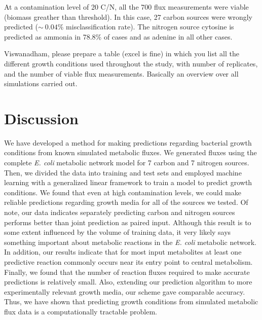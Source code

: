 \documentclass[12pt]{article}
\begin{document}
At a contamination level of 20 C/N, all the 700 flux measurements were viable (biomass greather than threshold). In this case, 27 carbon sources were wrongly predicted ($\sim~0.04\%$ misclassification rate). The nitrogen source cytosine is predicted as ammonia in 78.8\% of cases and as adenine in all other cases.

{\color{red}Viswanadham, please prepare a table (excel is fine) in which you list all the different growth conditions used throughout the study, with number of replicates, and the number of viable flux measurements. Basically an overview over all simulations carried out.}

\section*{Discussion}

We have developed a method for making predictions regarding bacterial growth conditions from known simulated metabolic fluxes. We generated fluxes using the complete \emph{E. coli} metabolic network model for 7 carbon and 7 nitrogen sources. Then, we divided the data into training and test sets and employed machine learning with a generalized linear framework to train a model to predict growth conditions. We found that even at high contamination levels, we could make reliable predictions regarding growth media for all of the sources we tested. Of note, our data indicates separately predicting carbon and nitrogen sources performs better than joint prediction as paired input. Although this result is to some extent influenced by the volume of training data, it very likely says something important about metabolic reactions in the \emph{E. coli} metabolic network. In addition, our results indicate that for most input metabolites at least one predictive reaction commonly occurs near its entry point to central metabolism. Finally, we found that the number of reaction fluxes required to make accurate predictions is relatively small. Also, extending our prediction algorithm to more experimentally relevant growth media, our scheme gave comparable accuracy. Thus, we have shown that predicting growth conditions from simulated metabolic flux data is a computationally tractable problem.
\end{document}
